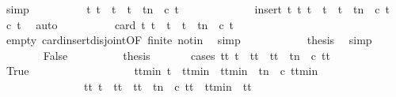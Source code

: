 \begin{isabellebody}
\ simp\isanewline
\ \ \ \ \ \ \ \ \isamarkupfalse%
\ {\isacartoucheopen}{\isacharbraceleft}t{\isacharprime}{\isachardot}\ t\ {\isasymle}\ t{\isacharprime}\ {\isasymand}\ t{\isacharprime}\ {\isasymle}\ t{\isacharplus}n\ {\isasymand}\ c\ t{\isacharprime}{\isacharbraceright}\isanewline
\ \ \ \ \ \ \ \ \ \ \ \ {\isacharequal}\ insert\ t\ {\isacharbraceleft}t{\isacharprime}{\isachardot}\ t\ {\isacharless}\ t{\isacharprime}\ {\isasymand}\ t{\isacharprime}\ {\isasymle}\ t{\isacharplus}n\ {\isasymand}\ c\ t{\isacharprime}{\isacharbraceright}{\isacartoucheclose}\ \isamarkupfalse%
\ {\isacartoucheopen}c\ t{\isacartoucheclose}\ \isamarkupfalse%
\ auto\isanewline
\ \ \ \ \ \ \ \ \isamarkupfalse%
\ {\isacartoucheopen}card\ {\isacharbraceleft}t{\isacharprime}{\isachardot}\ t\ {\isasymle}\ t{\isacharprime}\ {\isasymand}\ t{\isacharprime}\ {\isasymle}\ t{\isacharplus}n\ {\isasymand}\ c\ t{\isacharprime}{\isacharbraceright}\ {\isacharequal}\ {}{\isacartoucheclose}\isanewline
\ \ \ \ \ \ \ \ \ \ \isamarkupfalse%
\ empty\ card{\isacharunderscore}insert{\isacharunderscore}disjoint{\isacharbrackleft}OF\ finite\ notin{\isacharbrackright}\ \isamarkupfalse%
\ simp\isanewline
\ \ \ \ \ \ \ \ \isamarkupfalse%
\ \isamarkupfalse%
\ {\isacharquery}thesis\ \isamarkupfalse%
\ simp\isanewline
\ \ \ \ \isamarkupfalse%
\isanewline
\ \ \ \ \ \ \isamarkupfalse%
\ False\isanewline
\ \ \ \ \ \ \isamarkupfalse%
\ \isamarkupfalse%
\ {\isacharquery}thesis\isanewline
\ \ \ \ \ \ \isamarkupfalse%
{\isacharparenleft}cases\ {\isacartoucheopen}{\isasymexists}tt{\isachardot}\ t\ {\isacharless}\ tt\ {\isasymand}\ tt\ {\isasymle}\ t{\isacharplus}n\ {\isasymand}\ c\ tt{\isacartoucheclose}{\isacharparenright}\isanewline
\ \ \ \ \ \ \ \ \isamarkupfalse%
\ True\isanewline
\ \ \ \ \ \ \ \ \isanewline
\ \ \ \ \ \ \ \ \isamarkupfalse%
\ {\isacartoucheopen}{\isasymexists}ttmin{\isachardot}\ t\ {\isacharless}\ ttmin\ {\isasymand}\ ttmin\ {\isasymle}\ t{\isacharplus}n\ {\isasymand}\ c\ ttmin\isanewline
\ \ \ \ \ \ \ \ \ \ \ \ \ \ {\isasymand}\ {\isacharparenleft}{\isasymforall}tt{\isacharprime}{\isachardot}\ {\isacharparenleft}t\ {\isacharless}\ tt{\isacharprime}\ {\isasymand}\ tt{\isacharprime}\ {\isasymle}\ t{\isacharplus}n\ {\isasymand}\ c\ tt{\isacharprime}{\isacharparenright}\ {\isasymlongrightarrow}\ ttmin\ {\isasymle}\ tt{\isacharprime}{\isacharparenright}{\isacartoucheclose}\isanewline

\end{isabellebody}
